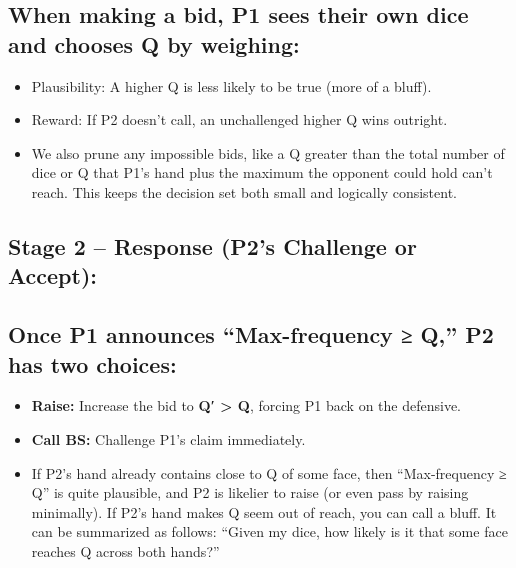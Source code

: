 \documentclass[
]{article}
\begin{document}
\subsection{When making a bid, P1 sees their own dice and chooses Q by
weighing:}\label{when-making-a-bid-p1-sees-their-own-dice-and-chooses-q-by-weighing}

\begin{itemize}
\item
  Plausibility: A higher Q is less likely to be true (more of a bluff).
\item
  Reward: If P2 doesn't call, an unchallenged higher Q wins outright.
\end{itemize}

\begin{itemize}
\item
  We also prune any impossible bids, like a Q greater than the total
  number of dice or Q that P1's hand plus the maximum the opponent could
  hold can't reach. This keeps the decision set both small and logically
  consistent.
\end{itemize}

\subsection{\texorpdfstring{\textbf{Stage 2 -- Response (P2's Challenge
or Accept):}
}{Stage 2 -- Response (P2's Challenge or Accept): }}\label{stage-2-response-p2s-challenge-or-accept}

\subsection{Once P1 announces ``Max-frequency ≥ Q,'' P2 has two
choices:}\label{once-p1-announces-max-frequency-q-p2-has-two-choices}

\begin{itemize}
\item
  \textbf{Raise:} Increase the bid to \textbf{Q′ \textgreater{} Q},
  forcing P1 back on the defensive.
\item
  \textbf{Call BS:} Challenge P1's claim immediately.
\end{itemize}

\begin{itemize}
\item
  If P2's hand already contains close to Q of some face, then
  ``Max-frequency ≥ Q'' is quite plausible, and P2 is likelier to raise
  (or even pass by raising minimally). If P2's hand makes Q seem out of
  reach, you can call a bluff. It can be summarized as follows: ``Given
  my dice, how likely is it that some face reaches Q across both
  hands?''
\end{itemize}
\end{document}
